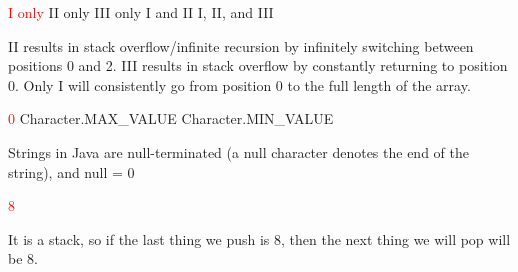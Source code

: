 \documentclass[11pt,addpoints]{exam}
\begin{document}
\begin{questions}
\begin{minipage}{\textwidth}
\begin{choices}
  \choice \textcolor{red}{I only}
  \choice II only
  \choice III only
  \choice I and II
  \choice I, II, and III \\
\end{choices}

II results in stack overflow/infinite recursion by infinitely switching between positions 0 and 2. III results in stack overflow by constantly returning to position 0. Only I will consistently go from position 0 to the full length of the array.

\end{minipage}


\begin{minipage}{\textwidth}

\begin{choices}
  \choice \textcolor{red}{0}
  \choice Character.MAX\_VALUE
  \choice Character.MIN\_VALUE
   \\ 
\end{choices}
\end{minipage}

Strings in Java are null-terminated (a null character denotes the end of the string), and null = 0 \\

\begin{minipage}{\textwidth}

\begin{choices}
  \choice \textcolor{red}{8}
   \\
\end{choices}
\end{minipage}

It is a stack, so if the last thing we push is 8, then the next thing we will pop will be 8. \\

\begin{minipage}{\textwidth}


\end{minipage}
\end{questions}
\end{document}
